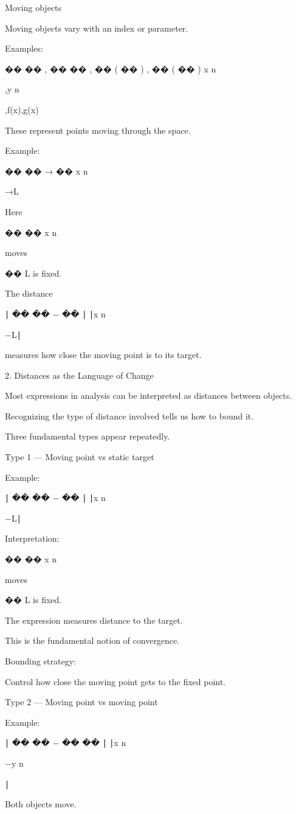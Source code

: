 Moving objects

Moving objects vary with an index or parameter.

Examples:

��
��
,
��
��
,
��
(
��
)
,
��
(
��
)
x
n
	​

,y
n
	​

,f(x),g(x)

These represent points moving through the space.

Example:

��
��
→
��
x
n
	​

→L

Here

��
��
x
n
	​

 moves

��
L is fixed.

The distance

∣
��
��
−
��
∣
∣x
n
	​

−L∣

measures how close the moving point is to its target.

2. Distances as the Language of Change

Most expressions in analysis can be interpreted as distances between objects.

Recognizing the type of distance involved tells us how to bound it.

Three fundamental types appear repeatedly.

Type 1 — Moving point vs static target

Example:

∣
��
��
−
��
∣
∣x
n
	​

−L∣

Interpretation:

��
��
x
n
	​

 moves

��
L is fixed.

The expression measures distance to the target.

This is the fundamental notion of convergence.

Bounding strategy:

Control how close the moving point gets to the fixed point.

Type 2 — Moving point vs moving point

Example:

∣
��
��
−
��
��
∣
∣x
n
	​

−y
n
	​

∣

Both objects move.

